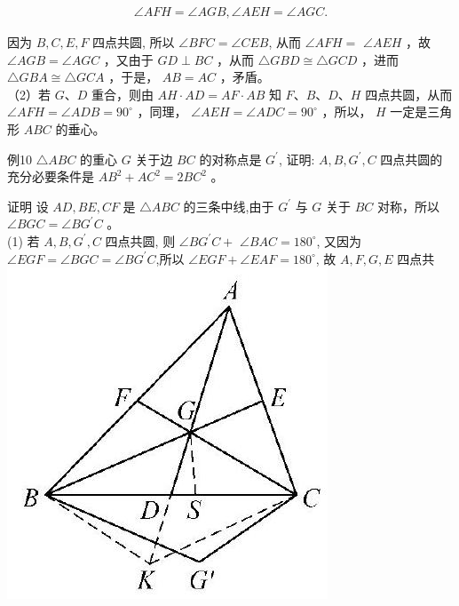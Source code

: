 \documentclass[10pt]{article}
\begin{document}
\begin{align*}
\angle A F H=\angle A G B, \angle A E H=\angle A G C .
\end{align*}

因为 $B, C, E, F$ 四点共圆, 所以 $\angle B F C=\angle C E B$, 从而 $\angle A F H=$ $\angle A E H$ ，故 $\angle A G B=\angle A G C$ ，又由于 $G D \perp B C$ ，从而 $\triangle G B D \cong \triangle G C D$ ，进而 $\triangle G B A \cong \triangle G C A$ ，于是， $A B=A C$ ，矛盾。\\
（2）若 $G 、 D$ 重合，则由 $A H \cdot A D=A F \cdot A B$ 知 $F 、 B 、 D 、 H$ 四点共圆，从而 $\angle A F H=\angle A D B=90^{\circ}$ ，同理， $\angle A E H=\angle A D C=90^{\circ}$ ，所以， $H$ 一定是三角形 $A B C$ 的垂心。

例10 $\triangle A B C$ 的重心 $G$ 关于边 $B C$ 的对称点是 $G^{\prime}$, 证明: $A, B, G^{\prime}, C$ 四点共圆的充分必要条件是 $A B^{2}+A C^{2}=2 B C^{2}$ 。

证明 设 $A D, B E, C F$ 是 $\triangle A B C$ 的三条中线,由于 $G^{\prime}$ 与 $G$ 关于 $B C$ 对称，所以 $\angle B G C=\angle B G^{\prime} C$ 。\\
(1) 若 $A, B, G^{\prime}, C$ 四点共圆, 则 $\angle B G^{\prime} C+$ $\angle B A C=180^{\circ}$, 又因为 $\angle E G F=\angle B G C=\angle B G^{\prime} C$,所以 $\angle E G F+\angle E A F=180^{\circ}$, 故 $A, F, G, E$ 四点共\\
\includegraphics[max width=\textwidth, center]{2024_10_30_66b8e5e701da2093c133g-048(1)}
\end{document}
